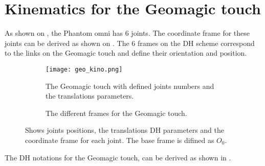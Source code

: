 \section{Kinematics for the Geomagic touch}

As shown on , the Phantom omni has 6 joints.
The coordinate frame for these joints can be derived as shown on . 
The 6 frames on the DH scheme correspond to the links on the Geomagic touch and define their orientation and position.


% 






\begin{figure}[H]

	\begin{subfigure}{.49\textwidth}
		\centering
		\texttt{[image: geo\_kino.png]}
		\caption{The Geomagic touch with defined joints numbers and the translations parameters.}
		\label{fig:Endo_plates11}
	\end{subfigure}
	\begin{subfigure}{.49\textwidth}
		\centering
		\vspace{5pt}
		
		\caption{The different frames for the Geomagic touch.}
		\label{fig:dhgeoframe1}
	\end{subfigure}
\caption{Shows joints positions, the translations \gls{DH} parameters and the coordinate frame for each joint. The base frame is difined as $O_{0}$.}
\label{fig:dhnotatso2}
\end{figure}



The DH notations for the Geomagic touch, can be derived as shown in .





